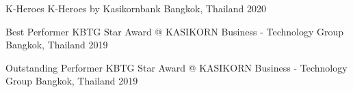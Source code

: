 
\begin{cvhonors}

  \cvhonor
    {K-Heroes} %
    {K-Heroes by Kasikornbank} %
    {Bangkok, Thailand} %
    {2020} %


  \cvhonor
    {Best Performer} %
    {KBTG Star Award @ KASIKORN Business - Technology Group} %
    {Bangkok, Thailand} %
    {2019} %


  \cvhonor
    {Outstanding Performer} %
    {KBTG Star Award @ KASIKORN Business - Technology Group} %
    {Bangkok, Thailand} %
    {2019} %

\end{cvhonors}
